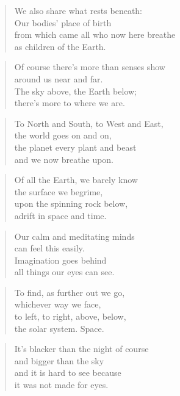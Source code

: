 \documentclass[10pt,a4paper]{article}
\begin{document}
\begin{multicols}{2}
\begin{verse}
We also share what rests beneath:\\
Our bodies’ place of birth\\
from which came all who now here breathe\\
as children of the Earth.
\end{verse}

\begin{verse}
Of course there’s more than senses show\\
around us near and far.\\
The sky above, the Earth below;\\
there’s more to where we are.
\end{verse}

\begin{verse}
To North and South, to West and East,\\
the world goes on and on,\\
the planet every plant and beast\\
and we now breathe upon.
\end{verse}

\begin{verse}
Of all the Earth, we barely know\\
the surface we begrime,\\
upon the spinning rock below,\\
adrift in space and time.
\end{verse}

\begin{verse}
Our calm and meditating minds\\
can feel this easily.\\
Imagination goes behind\\
all things our eyes can see.
\end{verse}

\begin{verse}
To find, as further out we go,\\
whichever way we face,\\
to left, to right, above, below,\\
the solar system. Space.
\end{verse}

\begin{verse}
It’s blacker than the night of course\\
and bigger than the sky\\
and it is hard to see because\\
it was not made for eyes.
\end{verse}


\end{multicols}
\end{document}
